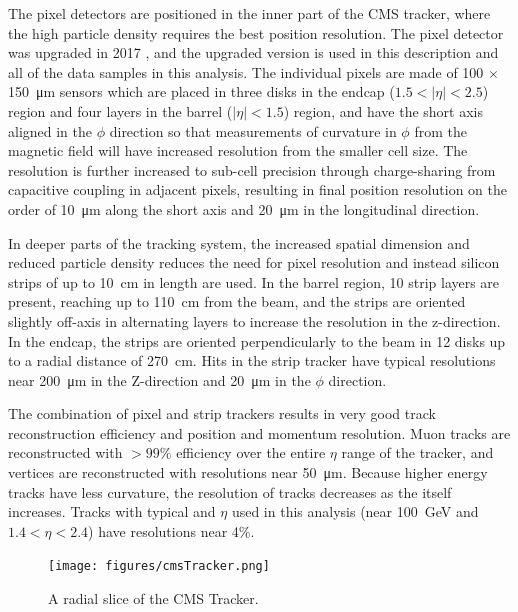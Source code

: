 The pixel detectors are positioned in the inner part of the CMS tracker, where the high particle density requires the best position resolution. 
The pixel detector was upgraded in 2017 \cite{pixelUpgrade}, and the upgraded version is used in this description and all of the data samples in this analysis. 
The individual pixels are made of 100 $\times$ \SI{150}{\micro\meter} sensors which are placed in three disks in the endcap ($1.5<\lvert\eta\rvert<2.5$) region and four layers in the barrel ($\lvert\eta\rvert<1.5$) region, and have the short axis aligned in the $\phi$ direction so that measurements of curvature in $\phi$ from the magnetic field will have increased resolution from the smaller cell size. 
The resolution is further increased to sub-cell precision through charge-sharing from capacitive coupling in adjacent pixels, resulting in final position resolution on the order of \SI{10}{\micro\meter} along the short axis and \SI{20}{\micro\meter} in the longitudinal direction.

In deeper parts of the tracking system, the increased spatial dimension and reduced particle density reduces the need for pixel resolution and instead silicon strips of up to \SI{10}{\centi\meter} in length are used. 
In the barrel region, 10 strip layers are present, reaching up to \SI{110}{\centi\meter} from the beam, and the strips are oriented slightly off-axis in alternating layers to increase the resolution in the z-direction. 
In the endcap, the strips are oriented perpendicularly to the beam in 12 disks up to a radial distance of \SI{270}{\centi\meter}.
Hits in the strip tracker have typical resolutions near \SI{200}{\micro\meter} in the Z-direction and \SI{20}{\micro\meter} in the $\phi$ direction.

The combination of pixel and strip trackers results in very good track reconstruction efficiency and position and momentum resolution.
Muon tracks are reconstructed with $>99\%$ efficiency over the entire $\eta$ range of the tracker, and vertices are reconstructed with resolutions near \SI{50}{\micro\meter}.
Because higher energy tracks have less curvature, the \pt resolution of tracks decreases as the \pt itself increases. Tracks with typical \pt and $\eta$ used in this analysis (\pt near \SI{100}{\giga\eV} and $1.4<\eta<2.4$) have resolutions near 4$\%$. 

\begin{figure}[h]
    \texttt{[image: figures/cmsTracker.png]}
    \centering
    \caption{A radial slice of the CMS Tracker.}
    \label{fig:cmsTracker}
\end{figure}


